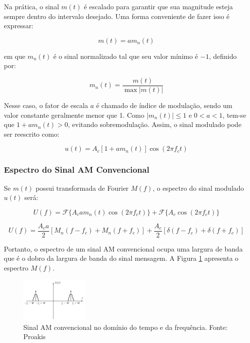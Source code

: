 Na prática, o sinal $m(t)$ é escalado para garantir que sua magnitude esteja sempre dentro do intervalo desejado. Uma forma conveniente de fazer isso é expressar:

\begin{equation}
m(t) = a m_n(t)
\end{equation}

em que $m_n(t)$ é o sinal normalizado tal que seu valor mínimo é $-1$, definido por:

\begin{equation}
m_n(t) = \frac{m(t)}{\max |m(t)|}
\end{equation}

Nesse caso, o fator de escala $a$ é chamado de índice de modulação, sendo um valor constante geralmente menor que 1. Como $|m_n(t)| \leq 1$ e $0 < a < 1$, tem-se que $1 + a m_n(t) > 0$, evitando sobremodulação. Assim, o sinal modulado pode ser reescrito como:

\begin{equation}
u(t) = A_c[1 + a m_n(t)] \cos(2\pi f_c t)
\end{equation}

\subsubsection*{Espectro do Sinal AM Convencional}

Se $m(t)$ possui transformada de Fourier $M(f)$, o espectro do sinal modulado $u(t)$ será:

\begin{equation}
U(f) = \mathcal{F}\{A_c a m_n(t) \cos(2\pi f_c t)\} + \mathcal{F}\{A_c \cos(2\pi f_c t)\}
\end{equation}

\begin{equation}
U(f) = \frac{A_c a}{2}[M_n(f - f_c) + M_n(f + f_c)] + \frac{A_c}{2}[\delta(f - f_c) + \delta(f + f_c)]
\end{equation}

Portanto, o espectro de um sinal AM convencional ocupa uma largura de banda que é o dobro da largura de banda do sinal mensagem. A Figura \ref{fig:am_espectro}  apresenta o espectro $M(f)$.

\begin{figure}[h]
\centering
\includegraphics[width=0.3\textwidth]{images/espectro_am.png}
\caption{Sinal AM convencional no domínio do tempo e da frequência. Fonte: Proakis} 
\label{fig:am_espectro}
\end{figure}

